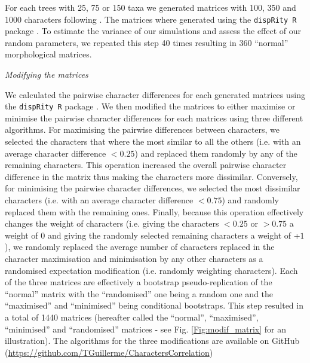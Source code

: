 \documentclass[12pt,letterpaper]{article}
\renewcommand{\subsection}[1]{%
\bigskip
\begin{center}
\begin{large}
\normalfont\itshape #1
\end{large}
\end{center}}
\begin{document}
For each trees with 25, 75 or 150 taxa we generated matrices with 100, 350 and 1000 characters following \cite{OReilly20160081}.
The matrices where generated using the \texttt{dispRity R} package \citep{thomas_guillerme_2016_55646}.
To estimate the variance of our simulations and assess the effect of our random parameters, we repeated this step 40 times resulting in 360 ``normal'' morphological matrices.

\subsection{Modifying the matrices}
We calculated the pairwise character differences for each generated matrices using the \texttt{dispRity R} package \citep{thomas_guillerme_2016_55646}.
We then modified the matrices to either maximise or minimise the pairwise character differences for each matrices using three different algorithms.
For maximising the pairwise differences between characters, we selected the characters that where the most similar to all the others (i.e. with an average character difference $<0.25$) and replaced them randomly by any of the remaining characters.
This operation increased the overall pairwise character difference in the matrix thus making the characters more dissimilar.
Conversely, for minimising the pairwise character differences, we selected the most dissimilar characters (i.e. with an average character difference $<0.75$) and randomly replaced them with the remaining ones.
Finally, because this operation effectively changes the weight of characters (i.e. giving the characters $<0.25$ or $>0.75$ a weight of $0$ and giving the randomly selected remaining characters a weight of +$1$), we randomly replaced the average number of characters replaced in the character maximisation and minimisation by any other characters as a randomised expectation modification (i.e. randomly weighting characters).
Each of the three matrices are effectively a bootstrap pseudo-replication of the ``normal'' matrix with the ``randomised'' one being a random one and the ``maximised'' and ``minimised'' being conditional bootstraps.
This step resulted in a total of 1440 matrices (hereafter called the ``normal'', ``maximised'', ``minimised'' and ``randomised'' matrices - see Fig. \ref{Fig:modif_matrix} for an illustration).
The algorithms for the three modifications are available on GitHub (\url{https://github.com/TGuillerme/CharactersCorrelation})
\end{document}
